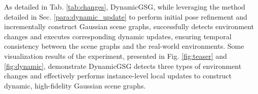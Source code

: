 As detailed in Tab. \ref{tab:changes}, DynamicGSG, while leveraging the method detailed in Sec. \ref{para:dynamic_update} to perform initial pose refinement and incrementally construct Gaussian scene graphs, successfully detects environment changes and executes corresponding dynamic updates, ensuring
temporal consistency between the scene graphs and the real-world environments. Some visualization results of the experiment, presented in Fig. \ref{fig:teaser} and \ref{fig:dynamic}, demonstrate DynamicGSG detects three types of environment changes and effectively performs instance-level local updates to construct dynamic, high-fidelity Gaussian scene graphs.

